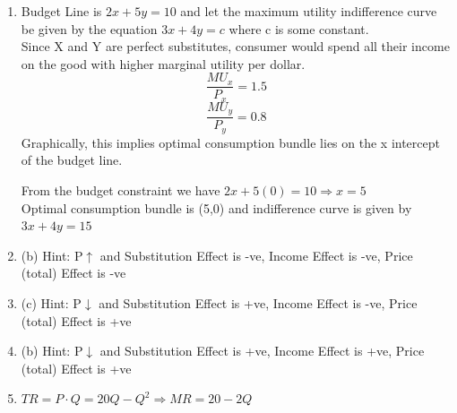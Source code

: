 \documentclass{article}
\begin{document}
\begin{enumerate}
\begin{enumerate}[label=(\roman*)]
            \item Deadweight loss = $\frac{1}{2} \times (36.25-26.25) \times (37.5-18.75) = 93.75$
            \item Tax Revenue = $10 \times 18.75 = \$187.5$
        \end{enumerate}   
    \item 
        Budget Line is $2x+5y=10$ and let the maximum utility indifference curve be given by the equation $3x+4y=c$ where c is some constant.\\
        Since X and Y are perfect substitutes, consumer would spend all their income on the good with higher marginal utility per dollar. 
        \[
        \frac{MU_x}{P_x} = 1.5
        \]
        \[
        \frac{MU_y}{P_y} = 0.8
        \]
        Graphically, this implies optimal consumption bundle lies on the x intercept of the budget line. 
        \begin{center}
        \end{center}
        From the budget constraint we have $2x+5(0)=10 \Rightarrow x=5$ \\
        Optimal consumption bundle is (5,0) and indifference curve is given by $3x+4y=15$
    \item 
        (b) Hint: P$\uparrow$ and Substitution Effect is -ve, Income Effect is -ve, Price (total) Effect is -ve
    \item 
        (c) Hint: P$\downarrow$ and Substitution Effect is +ve, Income Effect is -ve, Price (total) Effect is +ve
    \item
        (b) Hint: P$\downarrow$ and Substitution Effect is +ve, Income Effect is +ve, Price (total) Effect is +ve
    \item 
        $TR=P\cdot Q = 20Q-Q^2 \Rightarrow MR=20-2Q$ \\ 

\end{enumerate}
\end{document}
